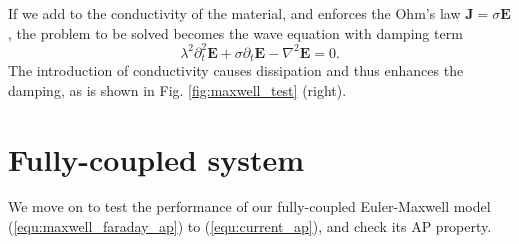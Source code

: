 \documentclass{report}
\begin{document}
If we add to the conductivity of the material, and enforces the Ohm's law $\mathbf{J} = \sigma \mathbf{E}$, the problem to be solved becomes the wave equation with damping term
\begin{equation*}
    \lambda^2\partial^2_t\mathbf{E} + \sigma \partial_t \mathbf{E} - \nabla^2 \mathbf{E} = 0.
\end{equation*}
The introduction of conductivity causes dissipation and thus enhances the damping, as is shown in Fig. \ref{fig:maxwell_test} (right).

\section{Fully-coupled system}
We move on to test the performance of our fully-coupled Euler-Maxwell model (\ref{equ:maxwell_faraday_ap}) to (\ref{equ:current_ap}), and check its AP property. 
\end{document}
